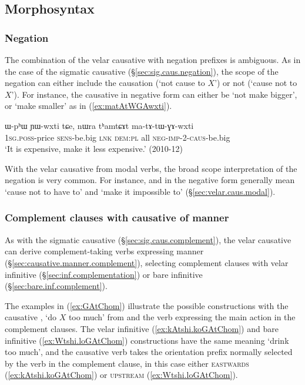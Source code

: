  
\subsection{Morphosyntax} \label{sec:velar.causative.morphosyntax}

\subsubsection{Negation} \label{sec:velar.causative.negation}
The combination of the velar causative with negation prefixes is ambiguous. As in the case of the sigmatic causative (§\ref{sec:sig.caus.negation}), the scope of the negation can either include the causation (`not cause to $X$') or not (`cause not to $X$'). For instance, the causative   in negative form can either be `not make bigger', or  `make smaller' as in (\ref{ex:matAtWGAwxti}).

\begin{exe}
\ex \label{ex:matAtWGAwxti}
\gll  ɯ-pʰɯ ɲɯ-wxti tɕe, nɯra tʰamtɕɤt ma-tɤ-tɯ-ɣɤ-wxti \\
\textsc{1sg}.\textsc{poss}-price \textsc{sens}-be.big \textsc{lnk} \textsc{dem}:\textsc{pl} all \textsc{neg}-\textsc{imp}-2-\textsc{caus}-be.big \\
\glt  `It is expensive, make it less expensive.' (2010-12)
\end{exe} 
 
With the velar causative from modal verbs, the broad scope interpretation of the negation is very common. For instance,   and   in the negative form generally mean `cause not to have to' and `make it impossible to' (§\ref{sec:velar.caus.modal}).

\largerpage
\subsubsection{Complement clauses with causative of manner} \label{sec:velar.caus.complement}
As with the sigmatic causative (§\ref{sec:sig.caus.complement}), the velar causative can derive com\-ple\-ment-taking verbs expressing manner (§\ref{sec:causative.manner.complement}), selecting complement clauses with velar infinitive (§\ref{sec:inf.complementation}) or bare infinitive (§\ref{sec:bare.inf.complement}).

The examples in (\ref{ex:GAtChom}) illustrate the possible constructions with the causative , `do $X$ too much' from  and the verb  expressing the main action in the complement clauses. The velar infinitive (\ref{ex:kAtshi.koGAtChom}) and bare infinitive (\ref{ex:Wtshi.loGAtChom}) constructions have the same meaning `drink too much', and the causative verb takes the orientation prefix normally selected by the verb in the complement clause, in this case either \textsc{eastwards} (\ref{ex:kAtshi.koGAtChom}) or \textsc{upstream} (\ref{ex:Wtshi.loGAtChom}). 

